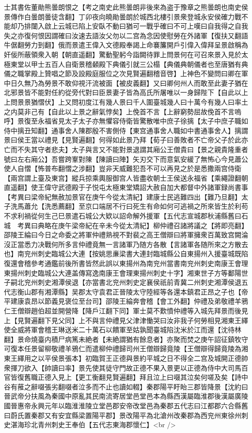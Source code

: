 士其書佐董勛熊曇朗恨之【考之南史此熊曇朗非後來為盗于豫章之熊曇朗也南史侯景傳作白曇朗曇徒含翻】丁卯夜向曉勛曇朗於城西北樓引景衆登城永安侯確力戰不能却乃排闥入啟上云城已陷上安臥不動曰猶可一戰乎確曰不可上嘆曰自我得之自我失之亦復何恨因謂確曰汝速去語汝父勿以二宫為念因使慰勞在外諸軍【復扶又翻語牛倨翻勞力到翻】俄而景遣王偉入文德殿奉謁上命褰簾開戶引偉入偉拜呈景啟稱為奸佞所蔽領衆入朝【朝直遥翻】驚動聖躬今詣闕待罪上問景何在可召來景入見於太極東堂以甲士五百人自衛景稽顙殿下典儀引就三公榻【典儀典朝儀者也至唐猶有典儀之職掌殿上贊唱之節及設殿庭服位之次見賢遍翻稽音啓】上神色不變問曰卿在軍中日久無乃為勞景不敢仰視汗流被面【被皮義翻】又曰卿何州人而敢至此妻子猶在北邪景皆不能對任約從旁代對曰臣景妻子皆為高氏所屠唯以一身歸陛下【自此以上上問景景猶慴伏】上又問初度江有幾人景曰千人圍臺城幾人曰十萬今有幾人曰率土之内莫非己有【自此以上景之辭氣悖矣】上俛首不言【上辭窮勢屈故俛首不言嗚呼】景復至永福省見太子太子亦無懼容侍衛皆驚散唯中庶子徐摛【太子中庶子職如侍中摛丑知翻】通事舍人陳郡殷不害側侍【東宫通事舍人職如中書通事舍人】摛謂景曰侯王當以禮見【見賢遍翻】何得如此景乃拜【荀子曰善敗者不亡帝父子於此亦亡而不失其守者悲夫】太子與言又不能對景退謂其廂公王僧貴曰【景之親貴隆重者號曰左右廂公】吾嘗跨鞌對陳【陳讀曰陣】矢刃交下而意氣安緩了無怖心今見蕭公使人自慴【怖普布翻慴之涉翻】豈非天威難犯吾不可以再見之於是悉撒兩宫侍衛【兩宫謂上臺及東宫】縱兵掠乘輿服御宫人皆盡收朝士王侯送永福省【乘繩證翻朝直遥翻】使王偉守武德殿于子悦屯太極東堂矯詔大赦自加大都督中外諸軍録尚書事　【考異曰梁帝紀無赦加景官在庚午今從太清紀】建康士民逃難四出【難乃旦翻】太子洗馬蕭允【洗悉薦翻】至京口端居不行曰死生有命如何可逃禍之所來皆生於利苟不求利禍從何生己巳景遣石城公大欵以詔命解外援軍【五代志宣城郡秋浦縣舊曰石城　考異曰典略在庚午梁帝紀在辛未今從太清紀】柳仲禮召諸將議之【將即亮翻】邵陵王綸曰今日之命委之將軍仲禮熟視不對裴之高王僧辯曰將軍擁衆百萬致宫闕淪沒正當悉力决戰何所多言仲禮竟無一言諸軍乃随方各散【言諸軍各随所來之方散去也】南兖州刺史臨城公大連【按姚思亷梁書大連封臨城縣公自東揚州入援臺城既陷復還會稽參考通鑑前後所書皆然此誤以東揚州為南兖州當書南兖州刺史南康王會理東揚州刺史臨城公大連盖傳寫逸南康王會理東揚州刺史十字】湘東世子方等鄱陽世子嗣北兖州刺史湘潭侯退【亦當書北兖州刺史定襄侯祇前青冀二州刺史湘潭侯退五代志衡山郡有湘潭縣】吴郡太守袁君正晉陵太守陸經等各還本鎮君正昂之子也【帝平建康袁昂以節義見褒位至台司】邵陵王綸奔會稽【會工外翻】仲禮及弟敬禮羊鴉仁王僧辯趙伯超並開營降【降戶江翻下同】軍士莫不歎憤仲禮等入城先拜景而後見上【見賢遍翻下見父同】上不與言仲禮見父津津慟哭曰汝非我子何勞相見湘東王繹使全威將軍會稽王琳送米二十萬石以饋軍至姑孰聞臺城陷沈米於江而還【沈待林翻】景命燒臺内積尸病篤未絶者【未絶謂猶有餘息者】亦聚而焚之庚午詔征鎮牧守可復本任景留柳敬禮羊鴉仁而遣柳仲禮歸司州王僧辯歸竟陵【王僧辯得歸竟陵為湘東王繹用之以平侯景張本】初臨賀王正德與景約平城之日不得全二宫及城開正德帥衆揮刀欲入【帥讀曰率】景先使其徒守門故正德不果入景更以正德為侍中大司馬百官皆復舊職正德入見上【更工衡翻見賢遍翻】拜且泣上曰啜其泣矣何嗟及矣【詩中谷有蓷之辭啜張劣翻啜者泣多而不止也讀如輟】秦郡陽平盱眙三郡皆降景【沈約曰晉武帝分扶風為秦國中原亂其民南流寄居堂邑堂邑本為縣西漢屬臨淮郡後漢屬廣陵國晉惠帝永興元年以臨淮淮陵立堂邑郡安帝改堂邑為秦郡五代志曰江都郡六合縣舊曰蔚氏置秦郡又有安宜縣梁置陽平郡】景改陽平為北滄州改秦郡為西兖州東徐州刺史湛海珍北青州刺史王奉伯【五代志東海郡懷仁】<br />
